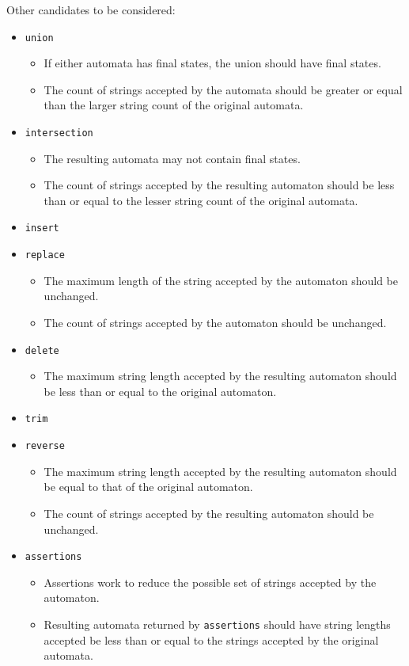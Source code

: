 \documentclass[letterpaper,11pt,twocolumn]{article}
\begin{document}
Other candidates to be considered:

\begin{itemize}
\item{\texttt{union}}
  \begin{itemize}
  \item{If either automata has final states, the union should have final
      states.}
  \item{The count of strings accepted by the automata should be greater or
      equal than the larger string count of the original automata.}
  \end{itemize}
\item{\texttt{intersection}}
  \begin{itemize}
  \item{The resulting automata may not contain final states.}
  \item{The count of strings accepted by the resulting automaton should be less
      than or equal to the lesser string count of the original automata.}
  \end{itemize}
\item{\texttt{insert}}
\item{\texttt{replace}}
  \begin{itemize}
  \item{The maximum length of the string accepted by the automaton should be
      unchanged.}
  \item{The count of strings accepted by the automaton should be unchanged.}
  \end{itemize}
\item{\texttt{delete}}
  \begin{itemize}
    \item{The maximum string length accepted by the resulting automaton should
        be less than or equal to the original automaton.}
  \end{itemize}
\item{\texttt{trim}}
\item{\texttt{reverse}}
  \begin{itemize}
  \item{The maximum string length accepted by the resulting automaton should be
      equal to that of the original automaton.}
  \item{The count of strings accepted by the resulting automaton should be unchanged.}
  \end{itemize}
\item{\texttt{assertions}}
  \begin{itemize}
    \item{Assertions work to reduce the possible set of strings accepted by the
        automaton.}
    \item{Resulting automata returned by \texttt{assertions} should have string
        lengths accepted be less than or equal to the strings accepted by the
        original automata.}
  \end{itemize}
\end{itemize}
\end{document}
